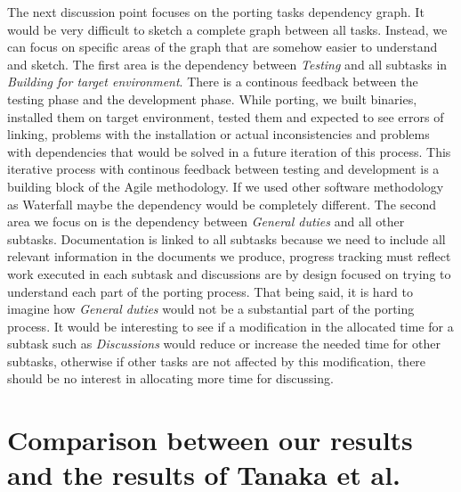 The next discussion point focuses on the porting tasks dependency graph. It
would be very difficult to sketch a complete graph between all tasks. Instead, we
can focus on specific areas of the graph that are somehow easier to understand
and sketch. The first area is the dependency between \textit{Testing} and all
subtasks in \textit{Building for target environment}. There is a continous
feedback between the testing phase and the development phase. While porting, we
built binaries, installed them on target environment, tested them and expected
to see errors of linking, problems with the installation or actual
inconsistencies and problems with dependencies that would be solved in a future
iteration of this process. This iterative process with continous feedback
between testing and development is a building block of the Agile methodology. If
we used other software methodology as Waterfall maybe the dependency would be
completely different. The second area we focus on is the dependency between
\textit{General duties} and all other subtasks. Documentation is linked to all
subtasks because we need to include all relevant information in the documents we
produce, progress tracking must reflect work executed in each subtask and
discussions are by design focused on trying to understand each part of the
porting process. That being said, it is hard to imagine how \textit{General
duties} would not be a substantial part of the porting process. It would be
interesting to see if a modification in the allocated time for a subtask such
as \textit{Discussions} would reduce or increase the needed time for other
subtasks, otherwise if other tasks are not affected by this modification, there
should be no interest in allocating more time for discussing.

\section{Comparison between our results and the results of Tanaka et al.}

